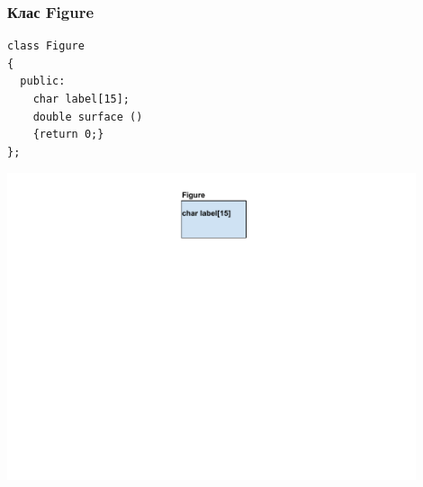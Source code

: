 \documentclass{beamer}
\begin{document}
\begin{frame}[fragile]
\frametitle{Клас Figure}


\begin{flushleft}
\begin{lstlisting}
class Figure
{
  public:
    char label[15];
    double surface ()
    {return 0;}
};
\end{lstlisting}  
\end{flushleft}


\begin{center}
\includegraphics[width=12.0cm]{images/inmem_figure}
\end{center}


\end{frame}
\end{document}

